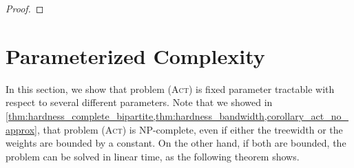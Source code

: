 \documentclass[runningheads]{llncs}
\numberwithin{equation}{section}
\newcommand{\set}[1]{\{ #1 \}}
\newcommand{\act}{\textsc{(Act)}}
\begin{document}
\begin{proof}
\end{proof}


\section{Parameterized Complexity}
\label{sec:positive_results}

In this section, we show that problem {\act} is fixed parameter tractable with respect to several different parameters. Note that we showed in \cref{thm:hardness_complete_bipartite,thm:hardness_bandwidth,corollary_act_no_approx}, that problem {\act} is NP-complete, even if either the treewidth or the weights are bounded by a constant. On the other hand, if both are bounded, the problem can be solved in linear time, as the following theorem shows.
\end{document}
